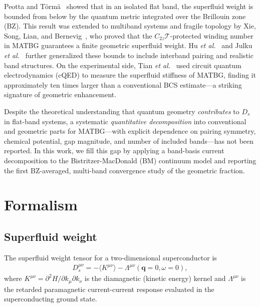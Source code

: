 \documentclass[prb,twocolumn,superscriptaddress,floatfix]{revtex4-2}
\begin{document}
Peotta and T\"orm\"a~\cite{peotta_torma_2015} showed that in an isolated flat band, the superfluid weight is bounded from below by the quantum metric integrated over the Brillouin zone (BZ).
This result was extended to multiband systems and fragile topology by Xie, Song, Lian, and Bernevig~\cite{xie_2020_prl}, who proved that the $C_{2z}\mathcal{T}$-protected winding number in MATBG guarantees a finite geometric superfluid weight.
Hu \textit{et al.}~\cite{hu_2019} and Julku \textit{et al.}~\cite{julku_2020} further generalized these bounds to include interband pairing and realistic band structures.
On the experimental side, Tian \textit{et al.}~\cite{tian_2023} used circuit quantum electrodynamics (cQED) to measure the superfluid stiffness of MATBG, finding it approximately ten times larger than a conventional BCS estimate---a striking signature of geometric enhancement.

Despite the theoretical understanding that quantum geometry \textit{contributes} to $D_s$ in flat-band systems, a systematic \textit{quantitative decomposition} into conventional and geometric parts for MATBG---with explicit dependence on pairing symmetry, chemical potential, gap magnitude, and number of included bands---has not been reported.
In this work, we fill this gap by applying a band-basis current decomposition to the Bistritzer-MacDonald (BM) continuum model and reporting the first BZ-averaged, multi-band convergence study of the geometric fraction.

\section{Formalism}

\subsection{Superfluid weight}

The superfluid weight tensor for a two-dimensional superconductor is~\cite{scalapino_1993}
\begin{align}
D_s^{\mu\nu} = -\langle K^{\mu\nu}\rangle - \Lambda^{\mu\nu}(\mathbf{q}=0,\omega=0),
\label{eq:Ds}
\end{align}
where $K^{\mu\nu} = \partial^2 H / \partial k_\mu \partial k_\nu$ is the diamagnetic (kinetic energy) kernel and $\Lambda^{\mu\nu}$ is the retarded paramagnetic current-current response evaluated in the superconducting ground state.
\end{document}
